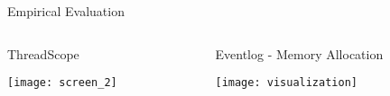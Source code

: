 \begin{frame}[fragile]{Empirical Evaluation}
  \begin{columns}[onlytextwidth] 
    \begin{column}{.45\textwidth} 
      \begin{block}{ThreadScope}
        \begin{minipage}{\textwidth}
          \texttt{[image: screen\_2]}
        \end{minipage}%
      \end{block}%
    \end{column} \hfill%
    \begin{column}{.45\textwidth} 
      \begin{block}{Eventlog - Memory Allocation}
        \begin{minipage}{\textwidth}
          \texttt{[image: visualization]}
        \end{minipage}%
      \end{block}
  \end{column} 
\end{columns}
\end{frame}
